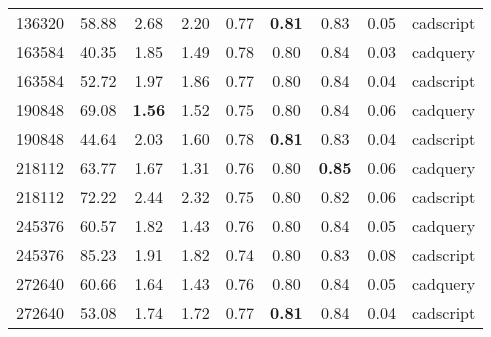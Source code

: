 \begin{table}[]
\begin{tabular}{c c c c c c c c c}
		136320              & 58.88                 & 2.68                  & 2.20                   & 0.77                   & \textbf{0.81}          & 0.83                    & 0.05          & cadscript \\
		163584              & 40.35                 & 1.85                  & 1.49                   & 0.78                   & 0.80                   & 0.84                    & 0.03          & cadquery  \\
		163584              & 52.72                 & 1.97                  & 1.86                   & 0.77                   & 0.80                   & 0.84                    & 0.04          & cadscript \\
		190848              & 69.08                 & \textbf{1.56}         & 1.52                   & 0.75                   & 0.80                   & 0.84                    & 0.06          & cadquery  \\
		190848              & 44.64                 & 2.03                  & 1.60                   & 0.78                   & \textbf{0.81}          & 0.83                    & 0.04          & cadscript \\
		218112              & 63.77                 & 1.67                  & 1.31                   & 0.76                   & 0.80                   & \textbf{0.85}           & 0.06          & cadquery  \\
		218112              & 72.22                 & 2.44                  & 2.32                   & 0.75                   & 0.80                   & 0.82                    & 0.06          & cadscript \\
		245376              & 60.57                 & 1.82                  & 1.43                   & 0.76                   & 0.80                   & 0.84                    & 0.05          & cadquery  \\
		245376              & 85.23                 & 1.91                  & 1.82                   & 0.74                   & 0.80                   & 0.83                    & 0.08          & cadscript \\
		272640              & 60.66                 & 1.64                  & 1.43                   & 0.76                   & 0.80                   & 0.84                    & 0.05          & cadquery  \\
		272640              & 53.08                 & 1.74                  & 1.72                   & 0.77                   & \textbf{0.81}          & 0.84                    & 0.04          & cadscript \\
		\hline
	\end{tabular}
\end{table}

